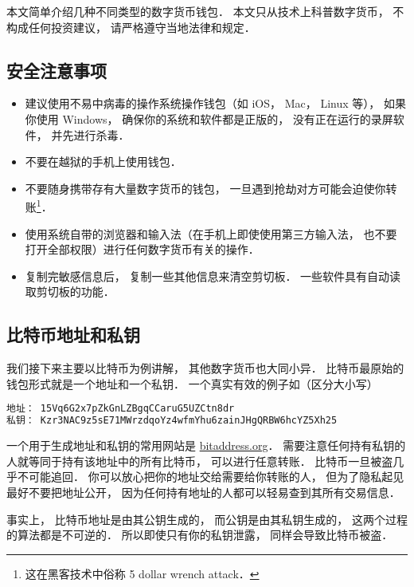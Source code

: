 
本文简单介绍几种不同类型的数字货币钱包． 本文只从技术上科普数字货币， 不构成任何投资建议， 请严格遵守当地法律和规定．

\subsection{安全注意事项}
\begin{itemize}
\item 建议使用不易中病毒的操作系统操作钱包（如 iOS， Mac， Linux 等）， 如果你使用 Windows， 确保你的系统和软件都是正版的， 没有正在运行的录屏软件， 并先进行杀毒．
\item 不要在越狱的手机上使用钱包．
\item 不要随身携带存有大量数字货币的钱包， 一旦遇到抢劫对方可能会迫使你转账\footnote{这在黑客技术中俗称 5 dollar wrench attack．}．
\item 使用系统自带的浏览器和输入法（在手机上即使使用第三方输入法， 也不要打开全部权限）进行任何数字货币有关的操作．
\item 复制完敏感信息后， 复制一些其他信息来清空剪切板． 一些软件具有自动读取剪切板的功能．
\end{itemize}

\subsection{比特币地址和私钥}
我们接下来主要以比特币为例讲解， 其他数字货币也大同小异． 比特币最原始的钱包形式就是一个地址和一个私钥． 一个真实有效的例子如（区分大小写）
\begin{lstlisting}[language=bash]
地址： 15Vq6G2x7pZkGnLZBgqCCaruG5UZCtn8dr
私钥： Kzr3NAC9z5sE71MWrzdqoYz4wfmYhu6zainJHgQRBW6hcYZ5Xh25
\end{lstlisting}
一个用于生成地址和私钥的常用网站是 \href{https://www.bitaddress.org/}{bitaddress.org}． 需要注意任何持有私钥的人就等同于持有该地址中的所有比特币， 可以进行任意转账． 比特币一旦被盗几乎不可能追回． 你可以放心把你的地址交给需要给你转账的人， 但为了隐私起见最好不要把地址公开， 因为任何持有地址的人都可以轻易查到其所有交易信息．

事实上， 比特币地址是由其公钥生成的， 而公钥是由其私钥生成的， 这两个过程的算法都是不可逆的． 所以即使只有你的私钥泄露， 同样会导致比特币被盗．

